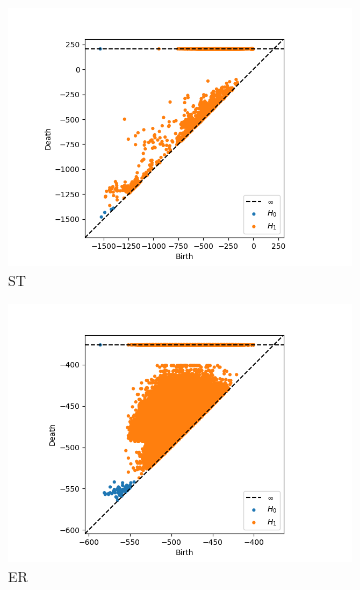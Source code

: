 \begin{figure}[ht]
  \centering

  \begin{subfigure}{.49 \linewidth}
    \includegraphics[scale=0.49]{./graph_phs/ST.png}
    \caption{ST}
  \end{subfigure}%
  \begin{subfigure}{.49 \linewidth}
    \includegraphics[scale=0.49]{./graph_phs/ER.png}
    \caption{ER}
  \end{subfigure}
  \begin{subfigure}{.49 \linewidth}

\end{subfigure}
\end{figure}
